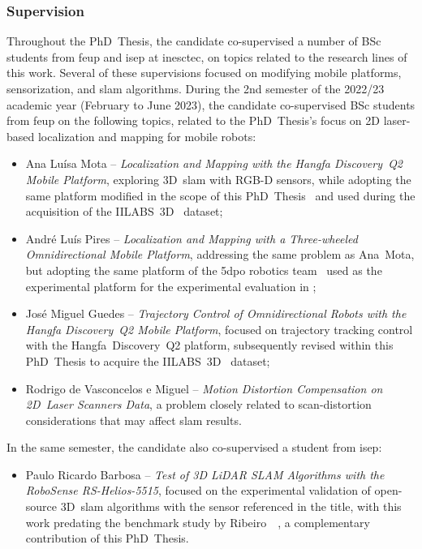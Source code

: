 \subsubsection{Supervision}

Throughout the PhD~Thesis, the candidate co-supervised a number of
BSc students from \gls{feup} and \gls{isep} at \gls{inesctec}, on topics
related to the research lines of this work. Several of these supervisions
focused on modifying mobile platforms, sensorization, and \gls{slam} algorithms.
During the 2nd semester of the 2022/23 academic year (February to
June 2023), the candidate co-supervised BSc students from \gls{feup}
on the following topics, related to the PhD~Thesis's
focus on 2D laser-based localization and mapping for mobile robots:
\begin{itemize}
\item Ana Luísa Mota -- \emph{Localization and Mapping with the Hangfa
      Discovery~Q2 Mobile Platform}, exploring 3D~\gls{slam} with RGB-D sensors,
      while adopting the same platform modified in the scope of this
      PhD~Thesis~\cite{sousa:icarsc:2025} and used during the acquisition of the
      IILABS~3D~\cite{ribeiro:access:2025} dataset;
\item André Luís Pires -- \textit{Localization and Mapping with a
      Three-wheeled Omnidirectional Mobile Platform},
      addressing the same problem as Ana~Mota, but adopting the same platform
      of the 5dpo robotics team~\cite{5dpo} used as the experimental platform
      for the experimental evaluation in ;
\item José Miguel Guedes -- \textit{Trajectory Control of Omnidirectional Robots
      with the Hangfa Discovery~Q2 Mobile Platform}, focused on trajectory
      tracking control with the Hangfa~Discovery~Q2 platform,
      subsequently revised within this PhD~Thesis to acquire the
      IILABS~3D~\cite{ribeiro:access:2025} dataset;
\item Rodrigo de Vasconcelos e Miguel -- \textit{Motion Distortion Compensation
      on 2D~Laser Scanners Data}, a problem closely related to
      scan-distortion considerations that may affect \gls{slam} results.
\end{itemize}

In the same semester, the candidate also co-supervised a student from \gls{isep}:
\begin{itemize}
\item Paulo Ricardo Barbosa -- \textit{Test of 3D LiDAR SLAM Algorithms
      with the RoboSense RS-Helios-5515}, focused on the experimental
      validation of open-source 3D~\gls{slam} algorithms with the
      sensor referenced in the title, with this work predating the
      benchmark study by Ribeiro~\etal~\cite{ribeiro:access:2025}, a
      complementary contribution of this PhD~Thesis.
\end{itemize}

